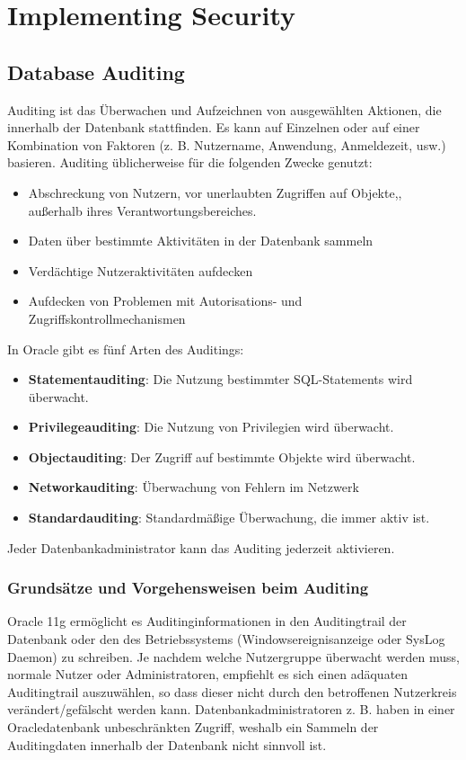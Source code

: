 \chapter{Implementing Security}
\chaptertoc{}
\cleardoubleevenpage

    \section{Database Auditing}
      Auditing ist das Überwachen und Aufzeichnen von ausgewählten Aktionen,
      die innerhalb der Datenbank stattfinden. Es kann auf Einzelnen oder auf
      einer Kombination von Faktoren (z. B. Nutzername, Anwendung, Anmeldezeit,
      usw.) basieren. Auditing üblicherweise für die folgenden Zwecke
      genutzt:
      \begin{itemize}
        \item Abschreckung von Nutzern, vor unerlaubten Zugriffen auf Objekte,,
        außerhalb ihres Verantwortungsbereiches.
        \item Daten über bestimmte Aktivitäten in der Datenbank sammeln
        \item Verdächtige Nutzeraktivitäten aufdecken
        \item Aufdecken von Problemen mit Autorisations- und Zugriffskontrollmechanismen
      \end{itemize}
      In Oracle gibt es fünf Arten des Auditings:
      \begin{itemize}
        \item \textbf{Statementauditing}: Die Nutzung bestimmter SQL-Statements wird überwacht.
        \item \textbf{Privilegeauditing}: Die Nutzung von Privilegien wird überwacht.
        \item \textbf{Objectauditing}: Der Zugriff auf bestimmte Objekte wird überwacht.
        \item \textbf{Networkauditing}: Überwachung von Fehlern im Netzwerk
        \item \textbf{Standardauditing}: Standardmäßige Überwachung, die immer aktiv ist.
      \end{itemize}
      \begin{merke}
        Jeder Datenbankadministrator kann das Auditing jederzeit aktivieren.
      \end{merke}
      \subsection{Grundsätze und Vorgehensweisen beim Auditing}
        Oracle 11g ermöglicht es Auditinginformationen in den Auditingtrail
        der Datenbank oder den des Betriebssystems (Windowsereignisanzeige oder
        SysLog Daemon) zu schreiben. Je nachdem welche Nutzergruppe überwacht
        werden muss, normale Nutzer oder Administratoren, empfiehlt es sich
        einen adäquaten Auditingtrail auszuwählen, so dass dieser nicht
        durch den betroffenen Nutzerkreis verändert/gefälscht werden kann.
        Datenbankadministratoren z. B. haben in einer Oracledatenbank
        unbeschränkten Zugriff, weshalb ein Sammeln der Auditingdaten innerhalb
        der Datenbank nicht sinnvoll ist.
